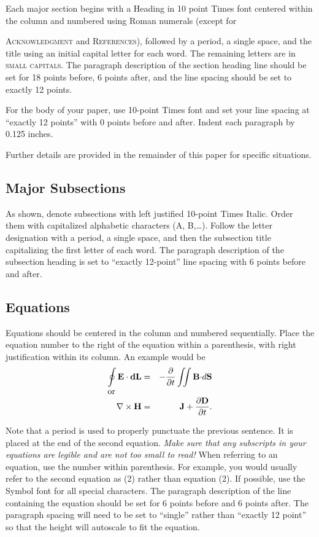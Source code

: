 \documentclass[conference]{IEEEtran}
\begin{document}
Each major section begins with a Heading in 10 point Times font centered within the column and numbered using Roman numerals (except for {{\scshape Acknowledgment} and {\scshape References}), followed by a period, a single space, and the title using an initial capital letter for each word. The remaining letters are in {\scshape small capitals}. The paragraph description of the section heading line should be set for 18 points before, 6 points after, and the line spacing should be set to exactly 12 points.

For the body of your paper, use 10-point Times font and set your line spacing at ``exactly 12 points'' with 0 points before and after. Indent each paragraph by 0.125 inches. 

Further details are provided in the remainder of this paper for specific situations.
\subsection{ Major Subsections}
As shown, denote subsections with left justified 10-point Times
Italic. Order them with capitalized alphabetic characters (A, B,\dots ). Follow the letter designation with a period, a single space, and then the subsection title capitalizing the first letter of each word. The paragraph description of the subsection heading is set to ``exactly
12-point'' line spacing with 6 points before and after.
\subsection{ Equations }
Equations should be centered in the column and numbered sequentially. Place the equation number to the right of the equation within a parenthesis, with right justification within its column. An example would be
\begin{eqnarray}
\oint {\bf E \cdot dL} & = & - {\partial\over \partial t}
\int\!\!\!\int {\bf B \cdot} d {\bf S}\\
\noalign{\hbox{or}}
\nabla \times {\bf H} & = & {\bf J} + {\partial {\bf D} \over \partial t}.
\end{eqnarray}

Note that a period is used to properly punctuate the previous
sentence. It is placed at the end of the second equation. {\itshape Make sure
that any subscripts in your equations are legible and are not too
small to read!} When referring to an equation, use the number within
parenthesis. For example, you would usually refer to the second
equation as (2) rather than equation (2). If possible, use the Symbol
font for all special characters.%
The paragraph description of the line containing the
equation should be set for 6 points before and 6 points after. The
paragraph spacing will need to be set to ``single'' rather than ``exactly
12 point'' so that the height will autoscale to fit the equation.

}
\end{document}
